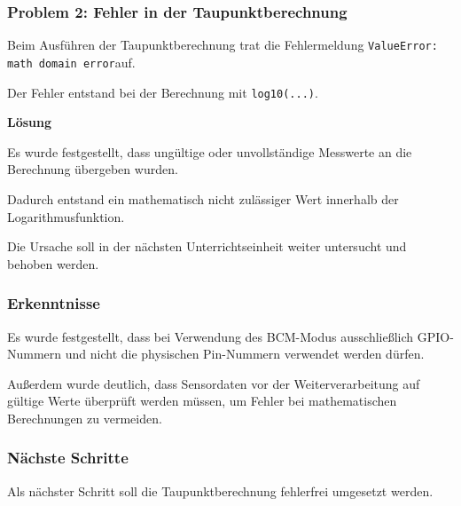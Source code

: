 \subsubsection{Problem 2: Fehler in der Taupunktberechnung}

Beim Ausführen der Taupunktberechnung trat die
Fehlermeldung
\texttt{ValueError: math domain error}auf.

Der Fehler entstand bei der Berechnung mit
\texttt{log10(...)}.

\textbf{Lösung}

Es wurde festgestellt, dass ungültige oder
unvollständige Messwerte an die Berechnung
übergeben wurden.

Dadurch entstand ein mathematisch nicht
zulässiger Wert innerhalb der Logarithmusfunktion.

Die Ursache soll in der nächsten
Unterrichtseinheit weiter untersucht und
behoben werden.

\subsubsection{Erkenntnisse}

Es wurde festgestellt, dass bei Verwendung des
BCM-Modus ausschließlich GPIO-Nummern und
nicht die physischen Pin-Nummern verwendet
werden dürfen.

Außerdem wurde deutlich, dass Sensordaten vor
der Weiterverarbeitung auf gültige Werte
überprüft werden müssen, um Fehler bei
mathematischen Berechnungen zu vermeiden.

\subsubsection{Nächste Schritte}

Als nächster Schritt soll die Taupunktberechnung
fehlerfrei umgesetzt werden.
